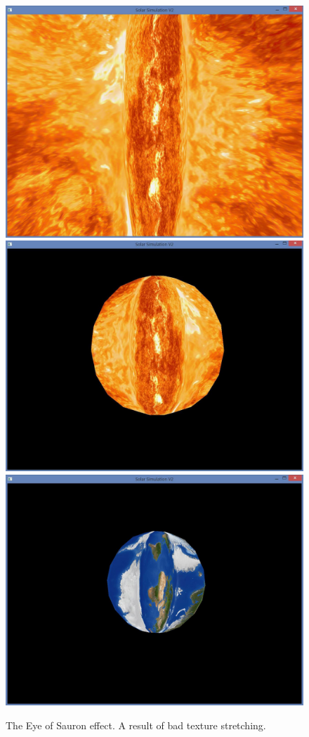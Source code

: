 \begin{figure}
	\centering
	\includegraphics[scale=0.1]{Pictures/Bugs/EyeOfSauronEffectInitial}
	\includegraphics[scale=0.1]{Pictures/Bugs/EyeOfSauronEffectSun}
	\includegraphics[scale=0.1]{Pictures/Bugs/EyeOfSauronEffectEarth}
	\label{EyeOfSauron}
	\caption{The Eye of Sauron effect. A result of bad texture stretching.}
\end{figure}
